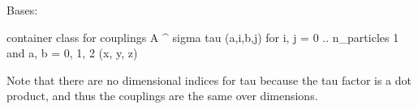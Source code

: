 \documentclass[letterpaper,10pt,english]{sphinxmanual}
\begin{document}
\begin{fulllineitems}
\label{\detokenize{spinbox:spinbox.core.SigmaTauCoupling}}
\pysigstartsignatures
{}
\pysigstopsignatures
\sphinxAtStartPar
Bases: {\hyperref[\detokenize{spinbox:spinbox.core.Coupling}]{}}

\sphinxAtStartPar
container class for couplings A \textasciicircum{} sigma tau (a,i,b,j)
for i, j = 0 .. n\_particles \sphinxhyphen{} 1
and a, b = 0, 1, 2  (x, y, z)

\sphinxAtStartPar
Note that there are no dimensional indices for tau because the tau factor is a dot product, and thus the couplings are the same over dimensions.

\begin{fulllineitems}
\label{\detokenize{spinbox:spinbox.core.SigmaTauCoupling.random}}
\pysigstartsignatures
{}
\pysigstopsignatures
\end{fulllineitems}


\begin{fulllineitems}
\label{\detokenize{spinbox:spinbox.core.SigmaTauCoupling.validate}}
\pysigstartsignatures
{}
\pysigstopsignatures
\end{fulllineitems}


\end{fulllineitems}

\end{document}
